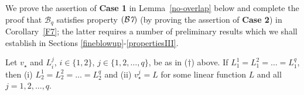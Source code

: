 \documentclass[a4paper,11pt]{amsart}
\begin{document}
We prove the assertion of {\bf Case 1} in Lemma~\ref{no-overlap} below and complete the proof that ${\mathcal B}_{q}$ satisfies property $({\mathcal B{\emph 7}})$ (by proving the assertion of {\bf Case 2}) in Corollary~\ref{F7}; the latter requires a number of preliminary results which we shall establish in Sections \ref{fineblowup}-\ref{propertiesIII}.
 
\begin{lemma}\label{no-overlap}
Let $v_{\star}$ and $L_{i}^{j}$, $i \in \{1, 2\}$, $j \in \{1,2, \ldots, q\}$, be as in {\rm (}$\dag${\rm )} above. If $L_{1}^{1} = L_{1}^{2} = \ldots  =L_{1}^{q}$, then {\rm (i)} $L_{2}^{1} = L_{2}^{2} = \ldots = L_{2}^{q}$ and {\rm (ii)} $v_{\star}^{j} = L$ for some linear function $L$ and all $j=1, 2, \ldots, q.$
\end{lemma}
\end{document}
